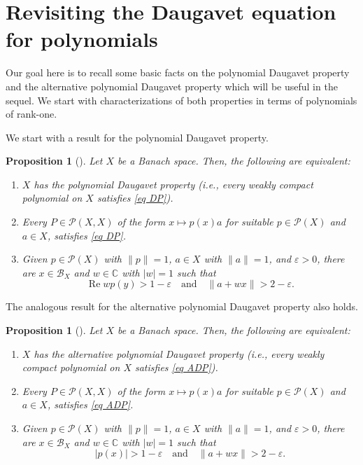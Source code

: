 \documentclass[10pt]{amsart}
\newtheorem{proposition}[theorem]{Proposition}
\def\CC{{\mathbb{C}}}
\DeclareMathOperator{\re}{Re}
\begin{document}
	\section{Revisiting the Daugavet equation for polynomials}\label{subsect:polDPR-polADP}
	Our goal here is to recall some basic facts on the polynomial Daugavet property and the alternative polynomial Daugavet property which will be useful in the sequel. We start with characterizations of both properties in terms of polynomials of rank-one.
	
	We start with a result for the polynomial Daugavet property.
	\begin{proposition}[\textrm{\cite[Theorem 1.1 or Corollary 2.2]{cgmm2}}]\label{prop_charpolDP}
		Let $X$ be a Banach space. Then, the following are equivalent:
		\begin{enumerate}[$(a)$]
			\item $X$ has the polynomial Daugavet property {\rm(}i.e., every weakly compact polynomial on $X$ satisfies \eqref{eq DP}{\rm)}.
			\item Every $P\in \mathcal{P}(X,X)$ of the form $x\longmapsto p(x)a$ for suitable $p\in \mathcal{P}(X)$ and $a\in X$, satisfies \eqref{eq DP}.
			\item Given $p\in \mathcal{P}(X)$ with $\|p\|=1$, $a\in X$ with $\|a\|=1$, and $\varepsilon>0$, there are $x\in \mathcal{B}_X$ and $w\in \CC$ with $|w|=1$ such that
			$$
			\re w p(y)>1-\varepsilon \quad \text{and} \quad \|a+ w x\|>2-\varepsilon.
			$$
		\end{enumerate}
	\end{proposition}
	
	The analogous result for the alternative polynomial Daugavet property also holds.
	\begin{proposition}[\textrm{\cite[Corollary~1.2]{cgmm2}}]\label{prop_charpol-ADP}
		Let $X$ be a Banach space. Then, the following are equivalent:
		\begin{enumerate}[$(a)$]
			\item $X$ has the alternative polynomial Daugavet property {\rm(}i.e., every weakly compact polynomial on $X$ satisfies \eqref{eq ADP}{\rm)}.
			\item Every $P\in \mathcal{P}(X,X)$ of the form $x\longmapsto p(x)a$ for suitable $p\in \mathcal{P}(X)$ and $a\in X$, satisfies \eqref{eq ADP}.
			\item Given $p\in \mathcal{P}(X)$ with $\|p\|=1$, $a\in X$ with $\|a\|=1$, and $\varepsilon>0$, there are $x\in \mathcal{B}_X$ and $w\in \CC$ with $|w|=1$ such that
			$$
			|p(x)|>1-\varepsilon \quad \text{and} \quad \|a+ w x\|>2-\varepsilon.
			$$
		\end{enumerate}
	\end{proposition}
	
\end{document}
